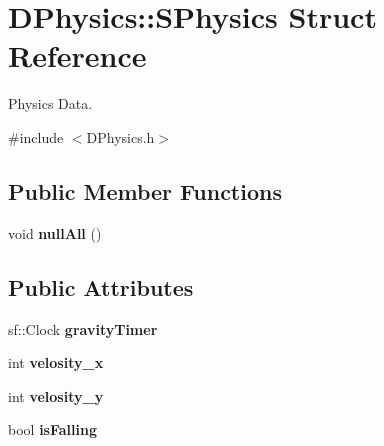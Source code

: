 \hypertarget{structDPhysics_1_1SPhysics}{\section{D\-Physics\-:\-:S\-Physics Struct Reference}
\label{structDPhysics_1_1SPhysics}
}


Physics Data.  




{\ttfamily \#include $<$D\-Physics.\-h$>$}

\subsection*{Public Member Functions}
\begin{DoxyCompactItemize}
\item 
\hypertarget{structDPhysics_1_1SPhysics_aa4cf9f9d5ae6ab52b53a76d7bc507e55}{void {\bfseries null\-All} ()}\label{structDPhysics_1_1SPhysics_aa4cf9f9d5ae6ab52b53a76d7bc507e55}

\end{DoxyCompactItemize}
\subsection*{Public Attributes}
\begin{DoxyCompactItemize}
\item 
\hypertarget{structDPhysics_1_1SPhysics_aee2f0f80a53a905eb9de32d3bb12e318}{sf\-::\-Clock {\bfseries gravity\-Timer}}\label{structDPhysics_1_1SPhysics_aee2f0f80a53a905eb9de32d3bb12e318}

\item 
\hypertarget{structDPhysics_1_1SPhysics_a2654e1fd65ea35fe4119c7866fd46274}{int {\bfseries velosity\-\_\-x}}\label{structDPhysics_1_1SPhysics_a2654e1fd65ea35fe4119c7866fd46274}

\item 
\hypertarget{structDPhysics_1_1SPhysics_a58c1f8fa61d0aeece450d7ab789c5013}{int {\bfseries velosity\-\_\-y}}\label{structDPhysics_1_1SPhysics_a58c1f8fa61d0aeece450d7ab789c5013}

\item 
\hypertarget{structDPhysics_1_1SPhysics_a39163a65d84fc6d7fd0be57560cffe12}{bool {\bfseries is\-Falling}}\label{structDPhysics_1_1SPhysics_a39163a65d84fc6d7fd0be57560cffe12}

\end{DoxyCompactItemize}


